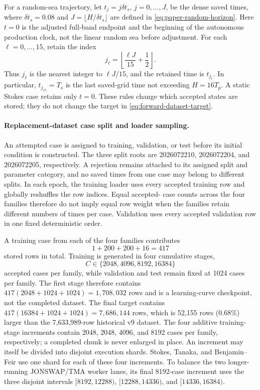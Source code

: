 For a random-sea trajectory, let \(t_j=j\delta t_s\),
\(j=0,\ldots,J\), be the dense saved times, where \(\delta t_s=0.08\) and
\(J=\lfloor H/\delta t_s\rfloor\) are defined in
\cref{eq:paper-random-horizon}.  Here \(t=0\) is the adjusted full-band
endpoint and the beginning of the autonomous production clock, not the
linear random sea before adjustment.  For each \(\ell=0,\ldots,15\), retain the
index
\begin{equation}
  j_\ell=
  \left\lfloor\frac{\ell J}{15}+\frac12\right\rfloor.
  \label{eq:paper-random-retained-indices}
\end{equation}
Thus \(j_\ell\) is the nearest integer to \(\ell J/15\), and the retained time
is \(t_{j_\ell}\).  In particular, \(t_{j_{15}}=T_s\) is the last saved-grid
time not exceeding \(H=16T_p\).  A static Stokes case retains only \(t=0\).
These rules change which accepted states are stored; they do not change the
target in \cref{eq:forward-dataset-target}.

\paragraph{Replacement-dataset case split and loader sampling.}
An attempted case is assigned to training, validation, or test before its
initial condition is constructed.  The three split roots are 2026072210,
2026072204, and 2026072205, respectively.  A rejection remains attached to
its assigned split and parameter category, and no saved times from one case may
belong to different splits.  In each epoch, the training loader uses every
accepted training row and globally reshuffles the row indices.  Equal accepted-
case counts across the four families therefore do not imply equal row weight
when the families retain different numbers of times per case.  Validation uses
every accepted validation row in one fixed deterministic order.

A training case from each of the four families contributes
\[
  1+200+200+16=417
\]
stored rows in total.  Training is generated in four cumulative stages,
\[
 C\in\{2048,4096,8192,16384\}
\]
accepted cases per family, while validation and test remain fixed at 1024
cases per family.  The first stage therefore contains
\(417(2048+1024+1024)=1{,}708{,}032\) rows and is a learning-curve checkpoint,
not the completed dataset.  The final target contains
\(417(16384+1024+1024)=7{,}686{,}144\) rows, which is 52,155 rows (0.68\%)
larger than the 7,633,989-row historical v9 dataset.  The four additive
training-stage increments contain 2048, 2048, 4096, and 8192 cases per family,
respectively; a completed chunk is never enlarged in place.  An increment may
itself be divided into disjoint execution shards.  Stokes, Tanaka, and
Benjamin--Feir use one shard for each of these four increments.  To balance
the two longer-running JONSWAP/TMA worker lanes, its final 8192-case increment
uses the three disjoint intervals \([8192,12288)\), \([12288,14336)\), and
\([14336,16384)\).

